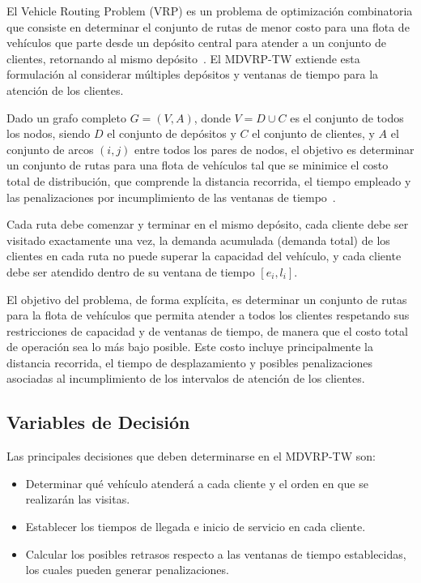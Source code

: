 \documentclass[letter, 10pt, dvipdfmx]{article}
\begin{document}
El Vehicle Routing Problem (VRP) es un problema de optimización combinatoria que consiste en determinar el conjunto de rutas de menor costo para una flota de
vehículos que parte desde un depósito central para atender a un conjunto de clientes, retornando al mismo depósito~\cite{Tan2001}. El MDVRP-TW extiende esta formulación
al considerar múltiples depósitos y ventanas de tiempo para la atención de los clientes.

Dado un grafo completo $G = (V, A)$, donde $V = D \cup C$ es el conjunto de todos los nodos, siendo $D$ el conjunto de depósitos y $C$ el conjunto de clientes, y $A$ el conjunto de arcos $(i,j)$
entre todos los pares de nodos, el objetivo es determinar un conjunto de rutas para una flota de vehículos tal que se minimice el costo total de distribución,
que comprende la distancia recorrida, el tiempo empleado y las penalizaciones por incumplimiento de las ventanas de tiempo~\cite{Li2024}.

Cada ruta debe comenzar y terminar en el mismo depósito, cada cliente debe ser visitado exactamente una vez, la demanda acumulada (demanda total) de los clientes en cada ruta no puede
superar la capacidad del vehículo, y cada cliente debe ser atendido dentro de su ventana de tiempo $[e_i, l_i]$.

El objetivo del problema, de forma explícita, es determinar un conjunto de rutas para la flota de vehículos que permita atender a todos los clientes respetando sus restricciones de capacidad y
de ventanas de tiempo, de manera que el costo total de operación sea lo más bajo posible. Este costo incluye principalmente la distancia recorrida, el tiempo de desplazamiento
y posibles penalizaciones asociadas al incumplimiento de los intervalos de atención de los clientes.

\subsection{Variables de Decisión}

Las principales decisiones que deben determinarse en el MDVRP-TW son:

\begin{itemize}
\item Determinar qué vehículo atenderá a cada cliente y el orden en que se realizarán las visitas.
\item Establecer los tiempos de llegada e inicio de servicio en cada cliente.
\item Calcular los posibles retrasos respecto a las ventanas de tiempo establecidas, los cuales pueden generar penalizaciones.
\end{itemize}
\end{document}
